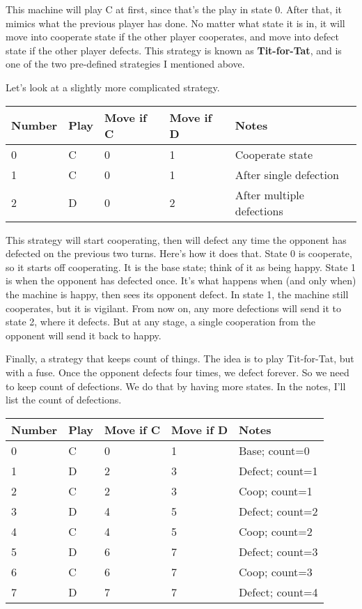 \documentclass[
  11pt,
]{article}
\begin{document}
This machine will play C at first, since that's the play in state 0.
After that, it mimics what the previous player has done. No matter what
state it is in, it will move into cooperate state if the other player
cooperates, and move into defect state if the other player defects. This
strategy is known as \textbf{Tit-for-Tat}, and is one of the two
pre-defined strategies I mentioned above.

Let's look at a slightly more complicated strategy.

\begin{longtable}[]{@{}lllll@{}}
\toprule()
Number & Play & Move if C & Move if D & Notes \\
\midrule()
\endhead
0 & C & 0 & 1 & Cooperate state \\
1 & C & 0 & 1 & After single defection \\
2 & D & 0 & 2 & After multiple defections \\
\bottomrule()
\end{longtable}

This strategy will start cooperating, then will defect any time the
opponent has defected on the previous two turns. Here's how it does
that. State 0 is cooperate, so it starts off cooperating. It is the base
state; think of it as being happy. State 1 is when the opponent has
defected once. It's what happens when (and only when) the machine is
happy, then sees its opponent defect. In state 1, the machine still
cooperates, but it is vigilant. From now on, any more defections will
send it to state 2, where it defects. But at any stage, a single
cooperation from the opponent will send it back to happy.

Finally, a strategy that keeps count of things. The idea is to play
Tit-for-Tat, but with a fuse. Once the opponent defects four times, we
defect forever. So we need to keep count of defections. We do that by
having more states. In the notes, I'll list the count of defections.

\newpage

\begin{longtable}[]{@{}lllll@{}}
\toprule()
Number & Play & Move if C & Move if D & Notes \\
\midrule()
\endhead
0 & C & 0 & 1 & Base; count=0 \\
1 & D & 2 & 3 & Defect; count=1 \\
2 & C & 2 & 3 & Coop; count=1 \\
3 & D & 4 & 5 & Defect; count=2 \\
4 & C & 4 & 5 & Coop; count=2 \\
5 & D & 6 & 7 & Defect; count=3 \\
6 & C & 6 & 7 & Coop; count=3 \\
7 & D & 7 & 7 & Defect; count=4 \\
\bottomrule()
\end{longtable}
\end{document}
